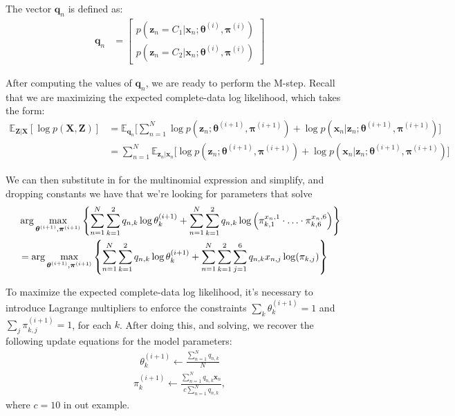 The vector $\textbf{q}_n$  is defined as:
%
\begin{align}
  \label{E-for-multinomial}
    \textbf{q}_n &= \begin{bmatrix}
                p(\textbf{z}_n = C_1 | \textbf{x}_n; \boldsymbol{\theta}^{(i)}, \boldsymbol{\pi}^{(i)}) \\
                p(\textbf{z}_n = C_2 | \textbf{x}_n; \boldsymbol{\theta}^{(i)}, \boldsymbol{\pi}^{(i)}) 
            \end{bmatrix} 
\end{align}


After computing the values of $\textbf{q}_n$, we are ready to perform the M-step.
Recall that we are maximizing the expected complete-data log likelihood, which takes the form:
%
\begin{align} \label{M-for-multinomial}
    \mathbb{E}_{\textbf{Z}|\textbf{X}}[\log p(\textbf{X}, \textbf{Z})] &= \mathbb{E}_{\textbf{q}_n} \bigg[\sum_{n=1}^{N} \log p(\textbf{z}_n; \boldsymbol{\theta}^{(i+1)}, \boldsymbol{\pi}^{(i+1)}) + \log p(\textbf{x}_n | \textbf{z}_n; \boldsymbol{\theta}^{(i+1)}, \boldsymbol{\pi}^{(i+1)})\bigg] \\ 
                                                                       &= \sum_{n=1}^{N} \mathbb{E}_{\textbf{z}_n|\textbf{x}_n} \bigg[ \log p(\textbf{z}_n; \boldsymbol{\theta}^{(i+1)}, \boldsymbol{\pi}^{(i+1)}) + \log p(\textbf{x}_n | \textbf{z}_n; \boldsymbol{\theta}^{(i+1)}, \boldsymbol{\pi}^{(i+1)})\bigg]
\end{align}

We can then substitute in for the multinomial expression and simplify,
and dropping constants we have that we're looking for
parameters that solve
%
\begin{align}
&  \arg\max_{\boldsymbol{\theta}^{(i+1)}, \boldsymbol{\pi}^{(i+1)}}\left\{
                \sum_{n=1}^{N} \sum_{k=1}^{2} q_{n, k}  \log \theta_k^{(i+1)} +
  \sum_{n=1}^{N} \sum_{k=1}^{2}q_{n,k}\log\left(\pi_{k,1}^{x_n,1}\cdot\ldots\cdot\pi_{k,6}^{x_n,6}\right) \right\}
 \notag \\
  &=  \arg\max_{\boldsymbol{\theta}^{(i+1)}, \boldsymbol{\pi}^{(i+1)}}\left\{
                \sum_{n=1}^{N} \sum_{k=1}^{2} q_{n, k}  \log \theta_k^{(i+1)} +
    \sum_{n=1}^{N} \sum_{k=1}^{2}\sum_{j=1}^6 q_{n,k}x_{n,j}\log(\pi_{k,j})\right\}
    \label{eq:dpnew1}
\end{align}

To maximize the expected complete-data log likelihood, it's necessary to introduce Lagrange multipliers to enforce the constraints $\sum_{k} \theta_k^{(i+1)} = 1$ and $\sum_{j} \pi_{k, j}^{(i+1)} = 1$, for each $k$. After doing this,
and solving, we recover the following update equations for the model parameters:
%
\begin{align*}
    \theta_{k}^{(i+1)} \leftarrow \frac{\sum_{n=1}^{N} q_{n, k}}{N}
\end{align*}
\begin{align*}
    \pi_{k}^{(i+1)} \leftarrow \frac{\sum_{n=1}^{N} q_{n, k} \textbf{x}_{n}}{c \sum_{n=1}^{N} q_{n, k} },
\end{align*}
%
where $c=10$ in out example.

